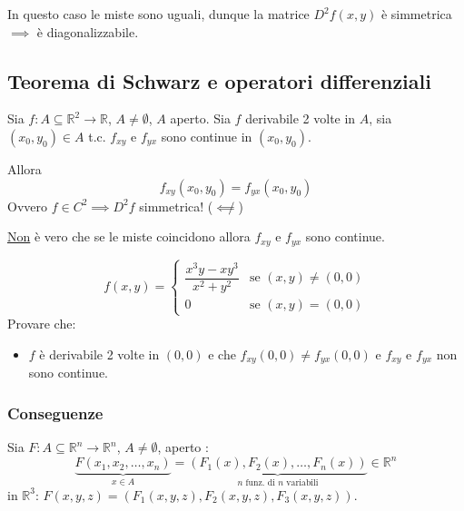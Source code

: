 \begin{oss}
In questo caso le miste sono uguali, dunque la matrice $D^2 f(x, y)$ è simmetrica $\implies$ è diagonalizzabile.
\end{oss}

\subsection{Teorema di Schwarz e operatori differenziali}

\begin{theorem}
Sia $f : A \subseteq \mathbb{R}^2 \to \mathbb{R}$, $A \neq \emptyset$, $A$ aperto. Sia $f$ derivabile 2 volte in $A$, sia $(x_0, y_0) \in A$ t.c. $f_{xy}$ e $f_{yx}$ sono continue in $(x_0, y_0)$.

Allora
\[
f_{xy}(x_0, y_0) = f_{yx}(x_0, y_0)
\]
Ovvero $f \in C^2 \implies D^2 f$ simmetrica! \quad ($\not\impliedby$)
\end{theorem}

\begin{oss}
\underline{Non} è vero che se le miste coincidono allora $f_{xy}$ e $f_{yx}$ sono continue.
\end{oss}

\begin{example*}[Controesempio]
\[
f(x, y) = \begin{cases}
\dfrac{x^3 y - x y^3}{x^2 + y^2} & \text{se } (x, y) \neq (0, 0) \\
0 & \text{se } (x, y) = (0, 0)
\end{cases}
\]
Provare che:
\begin{itemize}
    \item $f$ è derivabile 2 volte in $(0, 0)$ e che $f_{xy}(0, 0) \neq f_{yx}(0, 0)$ e $f_{xy}$ e $f_{yx}$ non sono continue.
\end{itemize}
\end{example*}

\subsubsection*{Conseguenze}

Sia $F : A \subseteq \mathbb{R}^n \to \mathbb{R}^n$, $A \neq \emptyset$, aperto :
\[
\underbrace{F(x_1, x_2, \dots, x_n)}_{x \in A} = \underbrace{(F_1(x), F_2(x), \dots, F_n(x))}_{n \text{ funz. di } n \text{ variabili}} \in \mathbb{R}^n
\]
in $\mathbb{R}^3$: $F(x, y, z) = (F_1(x, y, z), F_2(x, y, z), F_3(x, y, z))$.

